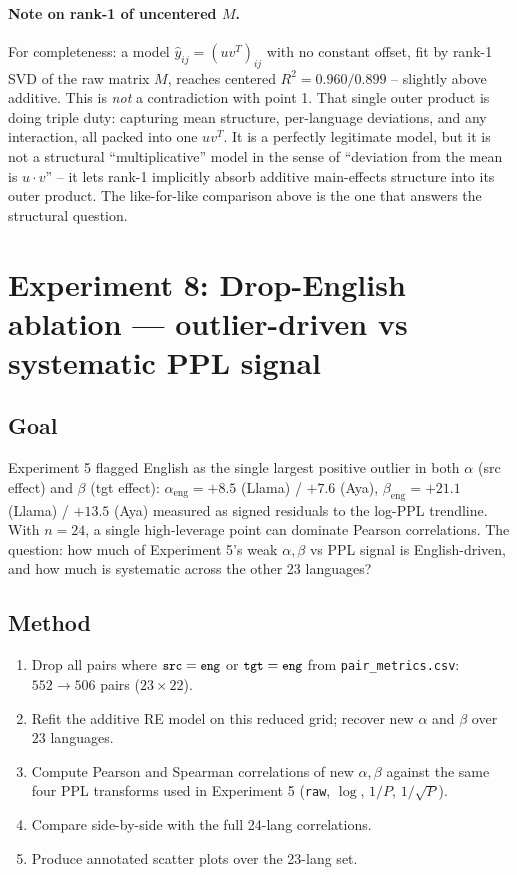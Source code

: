 \documentclass[11pt]{article}
\newcommand{\code}[1]{\texttt{\small #1}}
\begin{document}
\paragraph{Note on rank-1 of uncentered $M$.} For completeness: a model
$\hat y_{ij} = (u v^T)_{ij}$ with no constant offset, fit by rank-1 SVD of
the raw matrix $M$, reaches centered $R^2 = 0.960 / 0.899$ -- slightly
above additive. This is \emph{not} a contradiction with point 1. That
single outer product is doing triple duty: capturing mean structure,
per-language deviations, and any interaction, all packed into one
$u v^T$. It is a perfectly legitimate model, but it is not a structural
``multiplicative'' model in the sense of ``deviation from the mean is
$u \cdot v$'' -- it lets rank-1 implicitly absorb additive main-effects
structure into its outer product. The like-for-like comparison above is
the one that answers the structural question.

\section{Experiment 8: Drop-English ablation --- outlier-driven vs systematic PPL signal}

\subsection{Goal}

Experiment 5 flagged English as the single largest positive outlier in
both $\alpha$ (src effect) and $\beta$ (tgt effect): $\alpha_{\text{eng}}
= +8.5$ (Llama) / $+7.6$ (Aya), $\beta_{\text{eng}} = +21.1$ (Llama) /
$+13.5$ (Aya) measured as signed residuals to the log-PPL trendline.
With $n = 24$, a single high-leverage point can dominate Pearson
correlations. The question: how much of Experiment 5's weak $\alpha,
\beta$ vs PPL signal is English-driven, and how much is systematic
across the other 23 languages?

\subsection{Method}

\begin{enumerate}
  \item Drop all pairs where $\code{src} = \code{eng}$ or $\code{tgt} =
    \code{eng}$ from \code{pair\_metrics.csv}: $552 \to 506$ pairs
    ($23 \times 22$).
  \item Refit the additive RE model on this reduced grid; recover new
    $\alpha$ and $\beta$ over $23$ languages.
  \item Compute Pearson and Spearman correlations of new $\alpha, \beta$
    against the same four PPL transforms used in Experiment 5
    (\code{raw}, $\log$, $1/P$, $1/\sqrt{P}$).
  \item Compare side-by-side with the full 24-lang correlations.
  \item Produce annotated scatter plots over the 23-lang set.
\end{enumerate}
\end{document}
